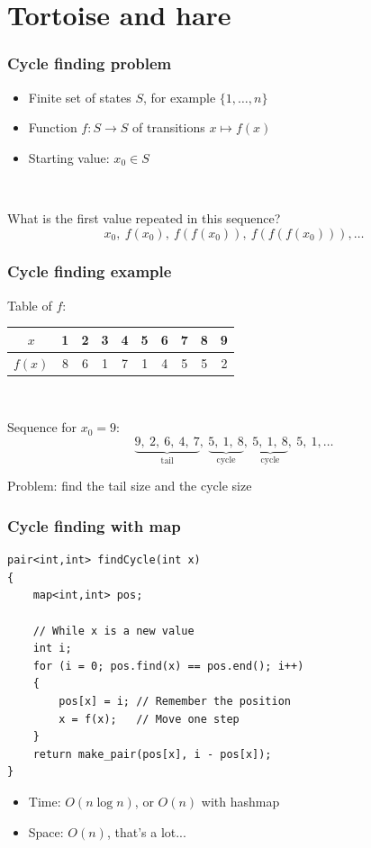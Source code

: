 \documentclass[12pt]{beamer}
\begin{document}
\section{Tortoise and hare}

\begin{frame}
\frametitle{Cycle finding problem}
\begin{itemize}
\item Finite set of states $S$, for example $\{1,\ldots,n\}$
\item Function $f: S \to S$ of transitions $x \mapsto f(x)$
\item Starting value: $x_0 \in S$
\end{itemize}

~

What is the first value repeated in this sequence?
\[ x_0,\ f(x_0),\ f(f(x_0)),\ f(f(f(x_0))), \ldots \]
\end{frame}

\begin{frame}
\frametitle{Cycle finding example}
Table of $f$:
\begin{center}
\begin{tabu}{c|ccccccccc}
$x$ &    1&2&3&4&5&6&7&8&9\\
\midrule
$f(x)$ & 8&6&1&7&1&4&5&5&2\\
\end{tabu}
\end{center}

~

Sequence for $x_0=9$:
\[
\underbrace{9,\ 2,\ 6,\ 4,\ 7}_\text{tail},
\ \underbrace{5,\ 1,\ 8}_\text{cycle},
\ \underbrace{5,\ 1,\ 8}_\text{cycle},
\ 5,\ 1,\ldots
\]

Problem: find the tail size and the cycle size
\end{frame}

\begin{frame}[fragile]
\frametitle{Cycle finding with map}
\begin{lstlisting}[frame=single]
pair<int,int> findCycle(int x)
{
    map<int,int> pos;
    
    // While x is a new value
    int i;
    for (i = 0; pos.find(x) == pos.end(); i++)
    {
        pos[x] = i; // Remember the position
        x = f(x);   // Move one step
    }
    return make_pair(pos[x], i - pos[x]);
}
\end{lstlisting}
\begin{itemize}
\item Time: $O(n \log n)$, or $O(n)$ with hashmap
\item Space: $O(n)$, that's a lot...
\end{itemize}
\end{frame}
\end{document}
